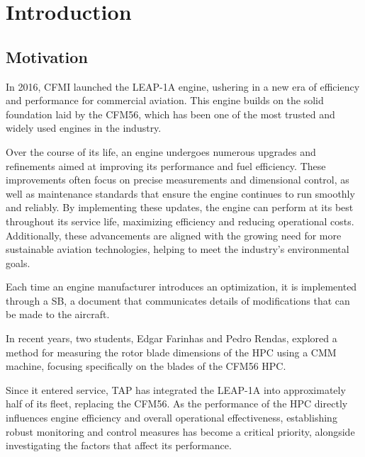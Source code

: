 
%

\chapter{Introduction}
\label{cha:introduction}


\section{Motivation}
\label{sec:motivation}

In 2016, CFMI launched the LEAP-1A engine, ushering in a new era of efficiency and performance for commercial aviation. This engine builds on the solid foundation laid by the CFM56, which has been one of the most trusted and widely used engines in the industry.

Over the course of its life, an engine undergoes numerous upgrades and refinements aimed at improving its performance and fuel efficiency. These improvements often focus on precise measurements and dimensional control, as well as maintenance standards that ensure the engine continues to run smoothly and reliably. By implementing these updates, the engine can perform at its best throughout its service life, maximizing efficiency and reducing operational costs. Additionally, these advancements are aligned with the growing need for more sustainable aviation technologies, helping to meet the industry's environmental goals.

Each time an engine manufacturer introduces an optimization, it is implemented through a \gls{SB}, a document that communicates details of modifications that can be made to the aircraft.

In recent years, two students, Edgar Farinhas and Pedro Rendas, explored a method for measuring the rotor blade dimensions of the \gls{HPC} using a \gls{CMM} machine, focusing specifically on the blades of the CFM56 \gls{HPC}. \cite{Farinha2021}

Since it entered service, \gls{TAP} has integrated the \gls{LEAP}-1A into approximately half of its fleet, replacing the CFM56. As the performance of the \gls{HPC} directly influences engine efficiency and overall operational effectiveness, establishing robust monitoring and control measures has become a critical priority, alongside investigating the factors that affect its performance. 


